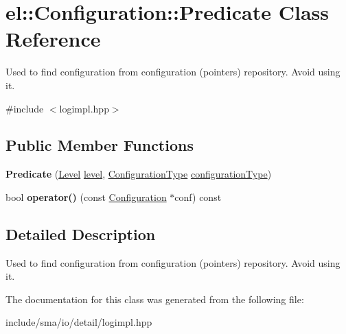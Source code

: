 \hypertarget{classel_1_1Configuration_1_1Predicate}{\section{el\-:\-:Configuration\-:\-:Predicate Class Reference}
\label{classel_1_1Configuration_1_1Predicate}
}


Used to find configuration from configuration (pointers) repository. Avoid using it.  




{\ttfamily \#include $<$logimpl.\-hpp$>$}

\subsection*{Public Member Functions}
\begin{DoxyCompactItemize}
\item 
\hypertarget{classel_1_1Configuration_1_1Predicate_ab0a4580d6c2d1aaf36a62913fdc38447}{{\bfseries Predicate} (\hyperlink{namespaceel_ab0ac6091262344c52dd2d3ad099e8e36}{Level} \hyperlink{classel_1_1Configuration_a66a96cf46d20204c50718f8a5e3622e2}{level}, \hyperlink{namespaceel_a281f5db6d6163678bc68a8b23b59e124}{Configuration\-Type} \hyperlink{classel_1_1Configuration_aab5091dcca176e309c0a2268ff55db0d}{configuration\-Type})}\label{classel_1_1Configuration_1_1Predicate_ab0a4580d6c2d1aaf36a62913fdc38447}

\item 
\hypertarget{classel_1_1Configuration_1_1Predicate_a985dce44ae06854e789a2ad3be11698f}{bool {\bfseries operator()} (const \hyperlink{classel_1_1Configuration}{Configuration} $\ast$conf) const }\label{classel_1_1Configuration_1_1Predicate_a985dce44ae06854e789a2ad3be11698f}

\end{DoxyCompactItemize}


\subsection{Detailed Description}
Used to find configuration from configuration (pointers) repository. Avoid using it. 

The documentation for this class was generated from the following file\-:\begin{DoxyCompactItemize}
\item 
include/sma/io/detail/logimpl.\-hpp\end{DoxyCompactItemize}
